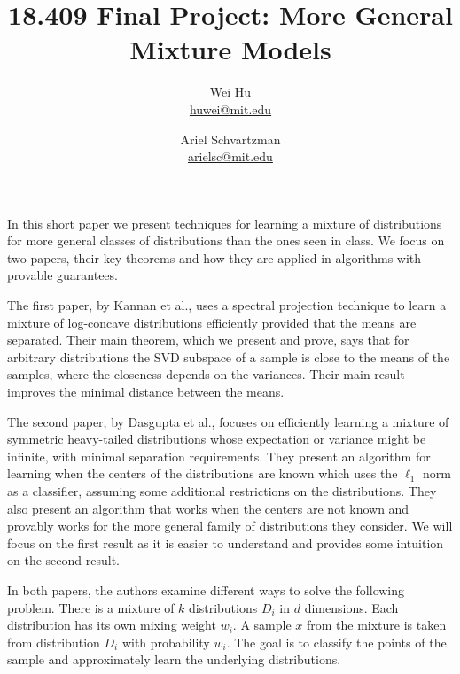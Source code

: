 \documentclass[11pt,letter]{article}
\begin{document}


\title{18.409 Final Project: More General Mixture Models}

\author{Wei Hu\\ \href{mailto:huwei@mit.edu}{huwei@mit.edu} \and Ariel Schvartzman \\ \href{mailto:arielsc@mit.edu}{arielsc@mit.edu}} 
 
\maketitle 

In this short paper we present techniques for learning a mixture of distributions for more general classes of distributions than the ones seen in class. We focus on two papers, their key theorems and how they are applied in algorithms with provable guarantees. 

The first paper, by Kannan et al.\cite{Kannan08spectral}, uses a spectral projection technique to learn a mixture of log-concave distributions efficiently provided that the means are separated. Their main theorem, which we present and prove, says that for arbitrary distributions the SVD subspace of a sample is close to the means of the samples, where the closeness depends on the variances. Their main result improves the minimal distance between the means. 

The second paper, by Dasgupta et al.\cite{Dasgupta05heavy-tail}, focuses on efficiently learning a mixture of symmetric heavy-tailed distributions whose expectation or variance might be infinite, with minimal separation requirements. They present an algorithm for learning when the centers of the distributions are known which uses the $\ell_1$ norm as a classifier, assuming some additional restrictions on the distributions. They also present an algorithm that works when the centers are not known and provably works for the more general family of distributions they consider. We will focus on the first result as it is easier to understand and provides some intuition on the second result. 

In both papers, the authors examine different ways to solve the following problem. There is a mixture of $k$ distributions $D_i$ in $d$ dimensions. Each distribution has its own mixing weight $w_i$. A sample $x$ from the mixture is taken from distribution $D_i$ with probability $w_i$. The goal is to classify the points of the sample and approximately learn the underlying distributions. 
\end{document}
